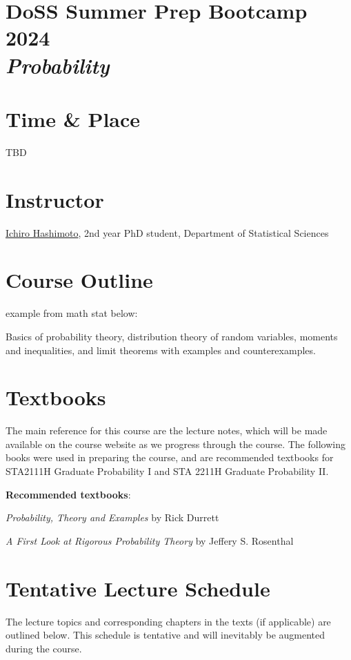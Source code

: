\documentclass[12pt]{article}
\date{ }
\begin{document}
\section*{DoSS Summer Prep Bootcamp 2024 \\  {\it{Probability}}}

\section{Time \& Place}
TBD

\section{Instructor}
\href{your webpage}{Ichiro Hashimoto}, 2nd year PhD student, Department of Statistical Sciences



\section{Course Outline}
example from math stat below:

Basics of probability theory, distribution theory of random variables, moments and inequalities, and limit theorems with examples and counterexamples.

\section{Textbooks}

The main reference for this course are the lecture notes, which will be made available on the course website as we progress through the course. The following books were used in preparing the course, and are recommended textbooks for STA2111H Graduate Probability I and STA 2211H Graduate Probability II. 

\vspace{1.0cm}

{\bf{Recommended textbooks}}:
\vspace{0.1cm}
\noindent

{\emph{Probability, Theory and Examples}} by Rick Durrett

{\emph{A First Look at Rigorous Probability Theory}} by Jeffery S. Rosenthal

\newpage
\section{Tentative Lecture Schedule}
The lecture topics and corresponding chapters in the texts (if applicable) are outlined below.  This schedule is tentative and will inevitably be augmented during the course.  
\end{document}
